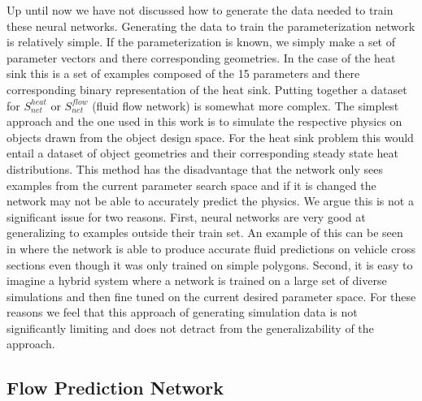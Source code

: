 \documentclass{article} %
\begin{document}
Up until now we have not discussed how to generate the data needed to train these neural networks. Generating the data to train the parameterization network is relatively simple. If the parameterization is known, we simply make a set of parameter vectors and there corresponding geometries. In the case of the heat sink this is a set of examples composed of the 15 parameters and there corresponding binary representation of the heat sink. Putting together a dataset for $S^{heat}_{net}$ or $S^{flow}_{net}$ (fluid flow network) is somewhat more complex. The simplest approach and the one used in this work is to simulate the respective physics on objects drawn from the object design space. For the heat sink problem this would entail a dataset of object geometries and their corresponding steady state heat distributions. This method has the disadvantage that the network only sees examples from the current parameter search space and if it is changed the network may not be able to accurately predict the physics. We argue this is not a significant issue for two reasons. First, neural networks are very good at generalizing to examples outside their train set. An example of this can be seen in \cite{guo2016convolutional} where the network is able to produce accurate fluid predictions on vehicle cross sections even though it was only trained on simple polygons. Second, it is easy to imagine a hybrid system where a network is trained on a large set of diverse simulations and then fine tuned on the current desired parameter space. For these reasons we feel that this approach of generating simulation data is not significantly limiting and does not detract from the generalizability of the approach.

\subsection{Flow Prediction Network}
\end{document}

